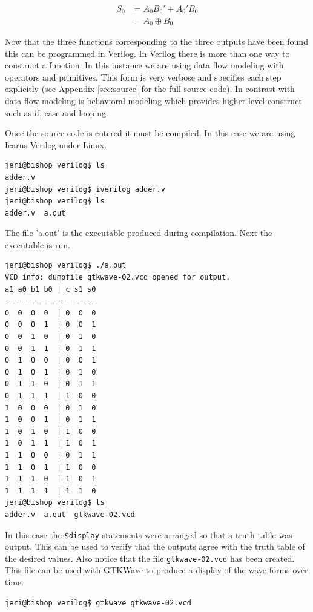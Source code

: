 \documentclass[12pt]{article}
\begin{document}
\begin{align}
S_0 &= A_0 B_0' + A_0' B_0 \label{eq:s0sop} \\
	&= A_0 \oplus B_0 \label{eq:s0}
\end{align}

Now that the three functions corresponding to the three outputs have
been found this can be programmed in Verilog.
In Verilog there is more than one way to construct a function.
In this instance we are using data flow modeling with operators and
primitives.
This form is very verbose and specifies each step explicitly
(see Appendix \ref{sec:source} for the full source code).
In contrast with data flow modeling is behavioral modeling which
provides higher level construct such as if, case and looping.

Once the source code is entered it must be compiled.
In this case we are using Icarus Verilog \cite{VERILOG} under Linux.

\begin{verbatim}
jeri@bishop verilog$ ls
adder.v
jeri@bishop verilog$ iverilog adder.v
jeri@bishop verilog$ ls
adder.v  a.out
\end{verbatim}

The file 'a.out' is the executable produced during compilation.
Next the executable is run.

\begin{verbatim}
jeri@bishop verilog$ ./a.out 
VCD info: dumpfile gtkwave-02.vcd opened for output.
a1 a0 b1 b0 | c s1 s0
---------------------
0  0  0  0  | 0  0  0
0  0  0  1  | 0  0  1
0  0  1  0  | 0  1  0
0  0  1  1  | 0  1  1
0  1  0  0  | 0  0  1
0  1  0  1  | 0  1  0
0  1  1  0  | 0  1  1
0  1  1  1  | 1  0  0
1  0  0  0  | 0  1  0
1  0  0  1  | 0  1  1
1  0  1  0  | 1  0  0
1  0  1  1  | 1  0  1
1  1  0  0  | 0  1  1
1  1  0  1  | 1  0  0
1  1  1  0  | 1  0  1
1  1  1  1  | 1  1  0
jeri@bishop verilog$ ls
adder.v  a.out  gtkwave-02.vcd
\end{verbatim}

In this case the \verb+$display+ statements were arranged so that
a truth table was output.
This can be used to verify that the outputs agree with the
truth table of the desired values.
Also notice that the file \verb+gtkwave-02.vcd+ has been created.
This file can be used with GTKWave to produce a display of the wave
forms over time.

\begin{verbatim}
jeri@bishop verilog$ gtkwave gtkwave-02.vcd
\end{verbatim}
\end{document}
